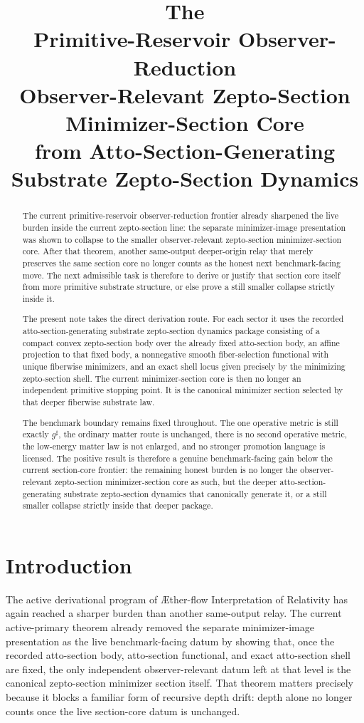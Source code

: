 \documentclass[11pt]{article}
\title{\textbf{The \TheoryName{}}\\[0.4em]
\large Primitive-Reservoir Observer-Reduction\\
\large Observer-Relevant Zepto-Section Minimizer-Section Core\\
\large from Atto-Section-Generating Substrate Zepto-Section Dynamics}
\author{}
\date{}
\newcommand{\Aflow}{\AE{}ther-flow}
\newcommand{\TheoryName}{\Aflow{} Interpretation of Relativity}
\newcommand{\CompletedMetric}{g^{\sharp}}
\begin{document}
\maketitle

\begin{abstract}
The current primitive-reservoir observer-reduction frontier already sharpened the live burden inside the current zepto-section line: the separate minimizer-image presentation was shown to collapse to the smaller observer-relevant zepto-section minimizer-section core. After that theorem, another same-output deeper-origin relay that merely preserves the same section core no longer counts as the honest next benchmark-facing move. The next admissible task is therefore to derive or justify that section core itself from more primitive substrate structure, or else prove a still smaller collapse strictly inside it.

The present note takes the direct derivation route. For each sector it uses the recorded atto-section-generating substrate zepto-section dynamics package consisting of a compact convex zepto-section body over the already fixed atto-section body, an affine projection to that fixed body, a nonnegative smooth fiber-selection functional with unique fiberwise minimizers, and an exact shell locus given precisely by the minimizing zepto-section shell. The current minimizer-section core is then no longer an independent primitive stopping point. It is the canonical minimizer section selected by that deeper fiberwise substrate law.

The benchmark boundary remains fixed throughout. The one operative metric is still exactly \(\CompletedMetric\), the ordinary matter route is unchanged, there is no second operative metric, the low-energy matter law is not enlarged, and no stronger promotion language is licensed. The positive result is therefore a genuine benchmark-facing gain below the current section-core frontier: the remaining honest burden is no longer the observer-relevant zepto-section minimizer-section core as such, but the deeper atto-section-generating substrate zepto-section dynamics that canonically generate it, or a still smaller collapse strictly inside that deeper package.
\end{abstract}

\section{Introduction}

The active derivational program of \TheoryName{} has again reached a sharper burden than another same-output relay. The current active-primary theorem already removed the separate minimizer-image presentation as the live benchmark-facing datum by showing that, once the recorded atto-section body, atto-section functional, and exact atto-section shell are fixed, the only independent observer-relevant datum left at that level is the canonical zepto-section minimizer section itself. That theorem matters precisely because it blocks a familiar form of recursive depth drift: depth alone no longer counts once the live section-core datum is unchanged.
\end{document}
